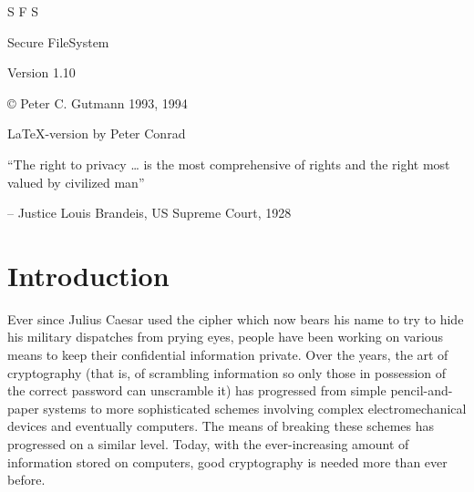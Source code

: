 


\begin{titlepage}
\begin{center}

\vspace*{5cm}


{\HUGE S F S}
\vspace*{2cm}

{\Large                  Secure FileSystem}

\vspace*{1cm} {\large      Version 1.10}
\vspace*{4cm}

                     \copyright{} Peter C. Gutmann  1993, 1994

\vspace*{4cm}
{\small \LaTeX-version by Peter Conrad}

\end{center}
\end{titlepage}

\parindent 0pt
\parskip 2mm

{\large      ``The right to privacy \dots\/ is the most comprehensive of rights and the
       right most valued by civilized man''

      \begin{flushright} -- Justice Louis Brandeis, US Supreme Court, 1928
      \end{flushright}}

\pagebreak

\tableofcontents

\section{Introduction}

Ever since Julius Caesar used the cipher which now bears his name to try to
hide his military dispatches from prying eyes, people have been working on
various means to keep their confidential information private.  Over the years,
the art of cryptography (that is, of scrambling information so only those in
possession of the correct password can unscramble it) has progressed from
simple pencil-and-paper systems to more sophisticated schemes involving complex
electromechanical devices and eventually computers.  The means of breaking
these schemes has progressed on a similar level.  Today, with the
ever-increasing amount of information stored on computers, good cryptography is
needed more than ever before.

